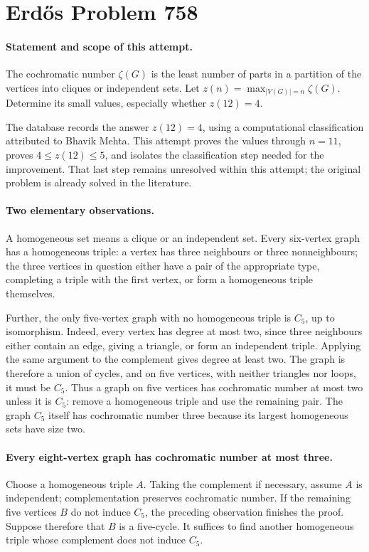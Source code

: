 \section*{Erd\H{o}s Problem 758}

\paragraph{Statement and scope of this attempt.}
The cochromatic number \(\zeta(G)\) is the least number of parts in a partition of the vertices into cliques or independent sets. Let \(z(n)=\max_{|V(G)|=n}\zeta(G)\). Determine its small values, especially whether \(z(12)=4\).

The database records the answer \(z(12)=4\), using a computational classification attributed to Bhavik Mehta. This attempt proves the values through \(n=11\), proves \(4\leq z(12)\leq5\), and isolates the classification step needed for the improvement. That last step remains unresolved within this attempt; the original problem is already solved in the literature.

\paragraph{Two elementary observations.}
A homogeneous set means a clique or an independent set. Every six-vertex graph has a homogeneous triple: a vertex has three neighbours or three nonneighbours; the three vertices in question either have a pair of the appropriate type, completing a triple with the first vertex, or form a homogeneous triple themselves.

Further, the only five-vertex graph with no homogeneous triple is \(C_5\), up to isomorphism. Indeed, every vertex has degree at most two, since three neighbours either contain an edge, giving a triangle, or form an independent triple. Applying the same argument to the complement gives degree at least two. The graph is therefore a union of cycles, and on five vertices, with neither triangles nor loops, it must be \(C_5\). Thus a graph on five vertices has cochromatic number at most two unless it is \(C_5\): remove a homogeneous triple and use the remaining pair. The graph \(C_5\) itself has cochromatic number three because its largest homogeneous sets have size two.

\paragraph{Every eight-vertex graph has cochromatic number at most three.}
Choose a homogeneous triple \(A\). Taking the complement if necessary, assume \(A\) is independent; complementation preserves cochromatic number. If the remaining five vertices \(B\) do not induce \(C_5\), the preceding observation finishes the proof. Suppose therefore that \(B\) is a five-cycle. It suffices to find another homogeneous triple whose complement does not induce \(C_5\).

